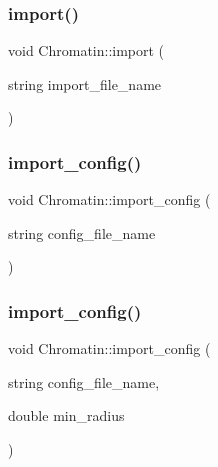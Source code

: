 \subsubsection{\texorpdfstring{import()}{import()}}
{\footnotesize\ttfamily void Chromatin\+::import (\begin{DoxyParamCaption}\item[{string}]{import\+\_\+file\+\_\+name }\end{DoxyParamCaption})}

\mbox{\label{classChromatin_a6e4c5827ebb4cd31cac05c05f5999ded}} 
\subsubsection{\texorpdfstring{import\_config()}{import\_config()}\hspace{0.1cm}{\footnotesize\ttfamily [1/2]}}
{\footnotesize\ttfamily void Chromatin\+::import\+\_\+config (\begin{DoxyParamCaption}\item[{string}]{config\+\_\+file\+\_\+name }\end{DoxyParamCaption})}

\mbox{\label{classChromatin_abb34912c862c4377fce32172d481075b}} 
\subsubsection{\texorpdfstring{import\_config()}{import\_config()}\hspace{0.1cm}{\footnotesize\ttfamily [2/2]}}
{\footnotesize\ttfamily void Chromatin\+::import\+\_\+config (\begin{DoxyParamCaption}\item[{string}]{config\+\_\+file\+\_\+name,  }\item[{double}]{min\+\_\+radius }\end{DoxyParamCaption})}

\mbox{\label{classChromatin_a7b7d1c6dd9bbd70c9efe5cfd180dc008}} 
